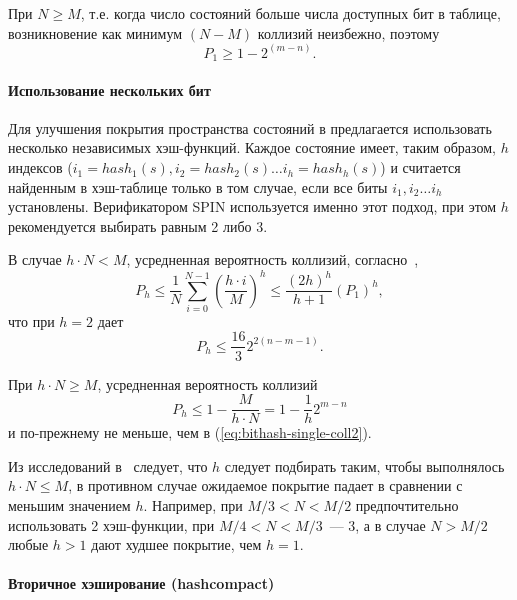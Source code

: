 При $N \geq M$, т.е. когда число состояний больше числа доступных бит в таблице,
возникновение как минимум $(N - M)$ коллизий неизбежно, поэтому
\begin{equation}
  \label{eq:bithash-single-coll2}
  P_1 \geq 1 - 2^{(m-n)}.
\end{equation}

\paragraph{Использование нескольких бит}
\label{sec:multi-bit-hashing}

Для улучшения покрытия пространства состояний в \cite{BitHash1} предлагается использовать
несколько независимых хэш-функций. Каждое состояние имеет, таким образом, $h$
индексов ($i_1 = hash_1(s), i_2 = hash_2(s) \ldots i_h = hash_h(s)$) и считается найденным
в хэш-таблице только в том случае, если все биты $i_1, i_2 \ldots i_h$
установлены. Верификатором SPIN используется именно этот подход, при этом $h$
рекомендуется выбирать равным 2 либо 3.~\cite{SpinRoot}

В случае $h \cdot N < M$, усредненная вероятность коллизий, согласно~\cite{BitHash1},
\begin{equation}
  \label{eq:bithash-multi-coll1}
  P_h \leq \frac{1}{N} \sum_{i=0}^{N-1} (\frac{h \cdot i}{M})^h \leq \frac{(2 h)^h}{h+1} (P_1)^h,
\end{equation}
что при $h = 2$ дает 
\begin{equation}
  \label{eq:bithash-2bit-coll1}
  P_h \leq \frac{16}{3} 2^{2(n -m - 1)}.
\end{equation}

При $h \cdot N \geq M$, усредненная вероятность коллизий 
\begin{equation}
  \label{eq:bithash-multi-coll2}
  P_h \leq 1 - \frac{M}{h \cdot N} = 1 - \frac{1}{h} 2^{m - n}
\end{equation}
и по-прежнему не меньше, чем в (\ref{eq:bithash-single-coll2}).

Из исследований в~\cite{BitHash1} следует, что $h$ следует подбирать таким, чтобы
выполнялось $h \cdot N \leq M$, в противном случае ожидаемое покрытие падает в сравнении с
меньшим значением $h$. Например, при $M/3 < N < M/2$ предпочтительно использовать 2
хэш-функции, при $M/4 < N < M/3$~--- 3, а в случае $N > M/2$ любые $h > 1$ дают худшее
покрытие, чем $h = 1$.

\paragraph{Вторичное хэширование (hashcompact)}
\label{sec:hashcompact}

